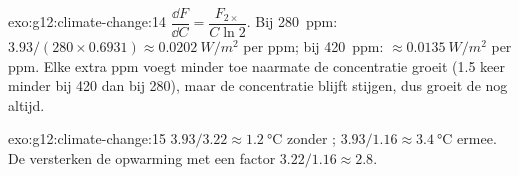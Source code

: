 \begin{solution}{exo:g12:climate-change:14}
$\dfrac{\dd F}{\dd C} = \dfrac{F_{2\times}}{C \ln 2}$. Bij \qty{280}{ppm}:
$3.93/(280 \times 0.6931) \approx \qty{0.0202}{W/m^2}$ per ppm; bij
\qty{420}{ppm}: $\approx \qty{0.0135}{W/m^2}$ per ppm. Elke extra ppm voegt
minder  toe naarmate de concentratie groeit (1.5 keer minder bij 420 dan bij 280),
maar de concentratie blijft stijgen, dus groeit de  nog altijd.
\end{solution}

\begin{solution}{exo:g12:climate-change:15}
$3.93/3.22 \approx \qty{1.2}{\degreeCelsius}$ zonder ;
$3.93/1.16 \approx \qty{3.4}{\degreeCelsius}$ ermee. De  versterken de opwarming
met een factor $3.22/1.16 \approx 2.8$.
\end{solution}

